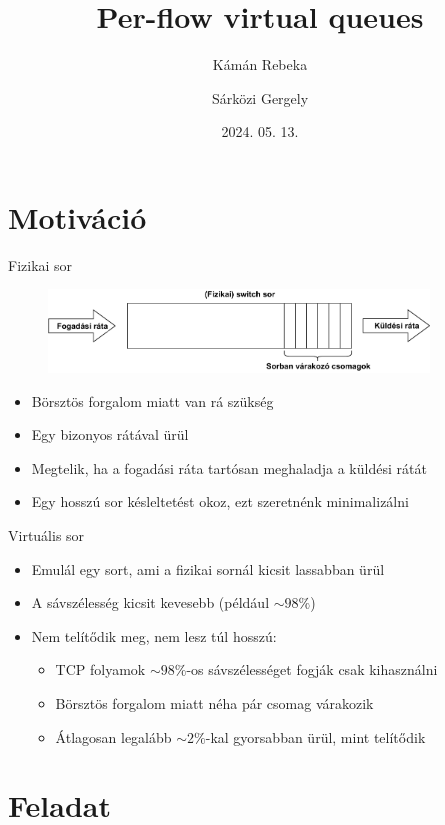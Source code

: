 \documentclass{beamer}
\title{Per-flow virtual queues}
\author{Kámán Rebeka \and Sárközi Gergely}
\date{2024. 05. 13.}
\begin{document}
\frame{\titlepage}

\section{Motiváció}

\begin{frame}{Fizikai sor}
\begin{figure}
    \centering
    \includegraphics[width=0.9\textwidth]{queue}
\end{figure}
\begin{itemize}
    \item Börsztös forgalom miatt van rá szükség
    \item Egy bizonyos rátával ürül
    \item Megtelik, ha a fogadási ráta tartósan meghaladja a küldési rátát
    \item Egy hosszú sor késleltetést okoz, ezt szeretnénk minimalizálni
\end{itemize}
\end{frame}

\begin{frame}{Virtuális sor}
\begin{itemize}
    \item Emulál egy sort, ami a fizikai sornál kicsit lassabban ürül
    \item A sávszélesség kicsit kevesebb (például $\sim 98\%$)
    \item Nem telítődik meg, nem lesz túl hosszú:
        \begin{itemize}
            \item TCP folyamok $\sim 98\%$-os sávszélességet fogják csak kihasználni
            \item Börsztös forgalom miatt néha pár csomag várakozik
            \item Átlagosan legalább $\sim 2\%$-kal gyorsabban ürül, mint telítődik
        \end{itemize}
\end{itemize}
\end{frame}


\section{Feladat}
\end{document}
